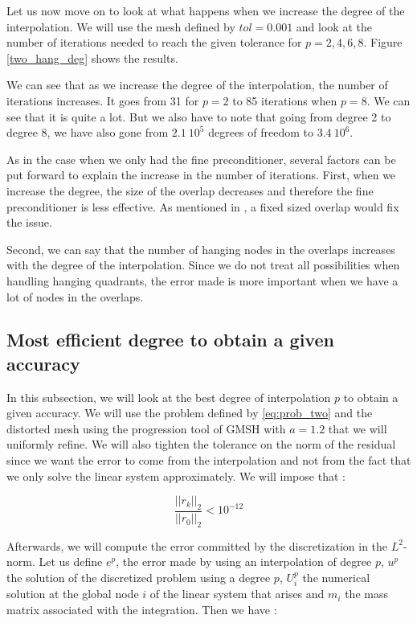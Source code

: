 Let us now move on to look at what happens when we increase the degree of the interpolation. We will use the mesh defined by $tol = 0.001$ and look at the number of iterations needed to reach the given tolerance for $p=2,4,6,8$. Figure \ref{two_hang_deg} shows the results. 

We can see that as we increase the degree of the interpolation, the number of iterations increases. It goes from 31 for $p=2$ to 85 iterations when $p=8$. We can see that it is quite a lot. But we also have to note that going from degree 2 to degree 8, we have also gone from $2.1\:10^5$ degrees of freedom to $3.4\:10^6$.

As in the case when we only had the fine preconditioner, several factors can be put forward to explain the increase in the number of iterations. First, when we increase the degree, the size of the overlap decreases and therefore the fine preconditioner is less effective. As mentioned in \cite{overlap_constant}, a fixed sized overlap would fix the issue. 

Second, we can say that the number of hanging nodes in the overlaps increases with the degree of the interpolation. Since we do not treat all possibilities when handling hanging quadrants, the error made is more important when we have a lot of nodes in the overlaps.


\subsection{Most efficient degree to obtain a given accuracy}

In this subsection, we will look at the best degree of interpolation $p$ to obtain a given accuracy. We will use the problem defined by \ref{eq:prob_two} and the distorted mesh using the progression tool of GMSH with $a=1.2$ that we will uniformly refine. We will also tighten the tolerance on the norm of the residual since we want the error to come from the interpolation and not from the fact that we only solve the linear system approximately. We will impose that : 

$$ \frac{||r_k||_2}{||r_0||_2} < 10^{-12} $$

Afterwards, we will compute the error committed by the discretization in the $L^2$-norm. Let us define $e^p$, the error made by using an interpolation of degree $p$, $u^p$ the solution of the discretized problem using a degree $p$, $U^p_i$ the numerical solution at the global node $i$ of the linear system that arises and $m_i$ the mass matrix associated with the integration. Then we have :  

